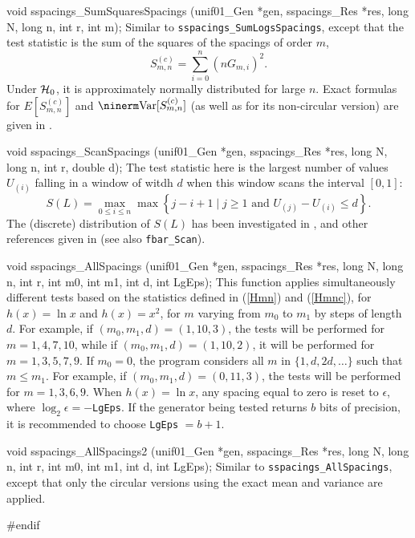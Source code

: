 void sspacings_SumSquaresSpacings (unif01_Gen *gen, sspacings_Res *res,
                                   long N, long n, int r, int m);
\endcode
\tab
  Similar to {\tt sspacings\_SumLogsSpacings}, except that the test 
   
  statistic is the sum of the squares of the spacings of order $m$,
 $$
   S_{m,n}^{(c)} = \sum_{i=0}^n (n G_{m,i})^2.
 $$
  Under $\mathcal{H}_0$, it is approximately normally distributed for large $n$.
  Exact formulas for $E[S_{m,n}^{(c)}]$ and $\Var[S_{m,n}^{(c)}]$ 
  (as well as for its non-circular version) are given in 
  \cite{tCRE79a,rLEC97h}.
\endtab
\code


void sspacings_ScanSpacings (unif01_Gen *gen, sspacings_Res *res,
                             long N, long n, int r, double d);
\endcode
\tab
  The test statistic  
  here is the largest number of values $U_{(i)}$ 
  falling in a window of witdh $d$ when this window scans the 
  interval $[0,1]$:
   $$ S(L) = \max_{0\le i\le n} \max \left\{j-i+1
        \mid j\ge 1 \mbox{ and } U_{(j)}-U_{(i)} \le d\right\}.$$
  The (discrete) distribution of $S(L)$ has been investigated in
  \cite{tAND95b,tCRE80a,tWAL74a},
  and other references given in \cite{tSTE86a}
  (see also {\tt fbar\_Scan}).
\endtab
\code


void sspacings_AllSpacings (unif01_Gen *gen, sspacings_Res *res,
                            long N, long n, int r, int m0, int m1, int d,
                            int LgEps);
\endcode
\tab
  This function 
  applies simultaneously different tests based
  on the statistics defined in  (\ref{Hmn}) and (\ref{Hmnc}),
  for $h(x) = \ln x$ and $h(x) = x^2$, 
  for $m$ varying from $m_0$ to $m_1$ by steps of length $d$.
  For example, if $(m_0, m_1, d) = (1, 10, 3)$,
  the tests will be performed for $m = 1, 4, 7, 10$, while if 
  $(m_0, m_1, d) = (1, 10, 2)$, it will be performed for $m = 1, 3, 5, 7, 9$.
  If $m_0 = 0$, the program considers all $m$ in $\{1, d, 2d, \dots\}$
  such that $m\le m_1$.  For example, if $(m_0, m_1, d) = (0, 11, 3)$,
  the tests will be performed for $m = 1, 3, 6, 9$.
  When $h(x) = \ln x$, any spacing equal to zero is reset to
  $\epsilon$, where  $\log_2 \epsilon = -${\tt LgEps}.
  If the generator being tested returns $b$ bits of precision, it is
  recommended to choose {\tt LgEps} $ = b+1$.
\endtab
\code


void sspacings_AllSpacings2 (unif01_Gen *gen, sspacings_Res *res,
                             long N, long n, int r, int m0, int m1, int d,
                             int LgEps);
\endcode
\tab
  Similar to  {\tt sspacings\_AllSpacings}, except that only the
  circular versions using the exact mean and variance are applied.
\endtab

\code
\hide
#endif
\endhide
\endcode

